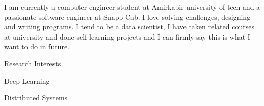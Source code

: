 

\begin{cvparagraph}
I am currently a computer engineer student at Amirkabir university of tech and a passionate software engineer at Snapp Cab. I love solving challenges, designing and writing programs. I tend to be a data scientist, I have taken related courses at university and done self learning projects and I can firmly say this is what I want to do in future.

\vspace{5mm}

  \cventry
    {}
    {Research Interests}
    {}
    {}
    {
      \begin{cvitems}
        \item {Deep Learning}
        \item {Distributed Systems}
      \end{cvitems}
    }

\end{cvparagraph}

